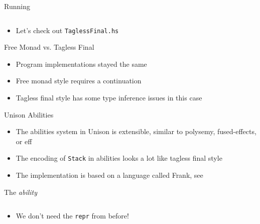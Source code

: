 \documentclass[hyperref={pdfpagelabels=false},12pt]{beamer}
\newcommand{\code}[2]{\texttt{#2}}
\newcommand{\haskell}[1]{\code{haskell}{#1}}
\newcommand{\bash}[1]{\code{bash}{#1}}
\newcommand{\unnamedUrl}[1]{\href{#1}{\color{blue}{#1}}}
\newcommand{\pygmentLines}[5]{\inputminted[bgcolor=lightgray,linenos,fontsize=#1,firstline=#2,lastline=#3,autogobble]{#4}{#5}}
\begin{document}
\begin{frame}{Running}
  \pygmentLines{\scriptsize}{53}{57}{haskell}{code/TaglessFinal.hs}
  \begin{itemize}
    \item Let's check out \bash{TaglessFinal.hs}
  \end{itemize}
\end{frame}

\begin{frame}{Free Monad vs. Tagless Final}
  \begin{itemize}
    \item Program implementations stayed the same
    \item Free monad style requires a continuation
    \item Tagless final style has some type inference issues in this case
  \end{itemize}
\end{frame}

\begin{frame}{Unison Abilities}
  \begin{itemize}
    \item The abilities system in Unison is extensible, similar to polysemy,
      fused-effects, or eff
    \item The encoding of \haskell{Stack} in abilities looks a lot like tagless
      final style
    \item The implementation is based on a language called Frank, see
      \unnamedUrl{https://arxiv.org/pdf/1611.09259.pdf}
  \end{itemize}
\end{frame}

\begin{frame}{The \textit{ability}}
  \pygmentLines{\scriptsize}{42}{45}{haskell}{code/ability.u}
  \begin{itemize}
    \item We don't need the \haskell{repr} from before!
  \end{itemize}
\end{frame}
\end{document}
